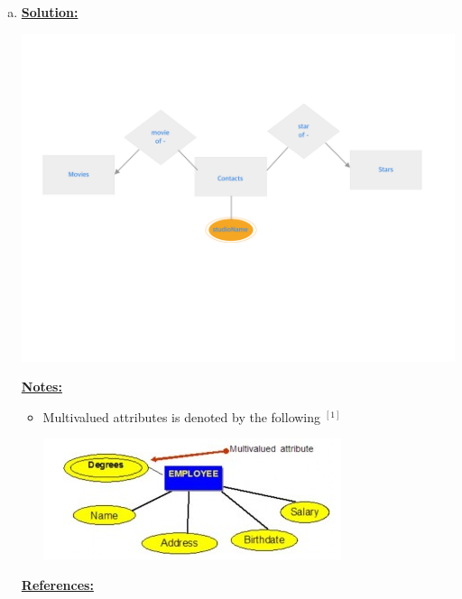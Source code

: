 \documentclass[12pt]{article}
\begin{document}
\begin{enumerate}[1.]
\begin{enumerate}[a)]
        \item \underline{\textbf{Solution:}}

        \bigskip

        \begin{center}
        \includegraphics[width=\linewidth]{images/worksheet_14_solution_42.png}
        \end{center}

        \bigskip

        \underline{\textbf{Notes:}}

        \bigskip

        \begin{itemize}
            \item Multivalued attributes is denoted by the following $^{[1]}$

            \begin{center}
            \includegraphics[width=0.7\linewidth]{images/worksheet_14_solution_43.png}
            \end{center}
        \end{itemize}

        \bigskip

        \underline{\textbf{References:}}


\end{enumerate}
\end{enumerate}
\end{document}
